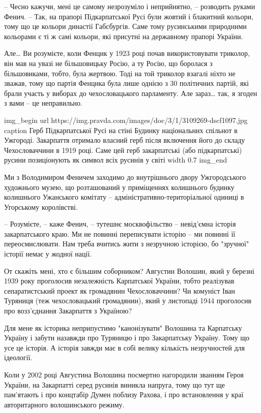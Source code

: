 – Чесно кажучи, мені це самому незрозуміло і неприйнятно, – розводить руками
Фенич. – Так, на прапорі Підкарпатської Русі були жовтий і блакитний кольори,
тому що це кольори династії Габсбургів. Саме тому русинськими природними
кольорами є ті ж самі кольори, які присутні на державному прапорі України.

Але… Ви розумієте, коли Фенцик у 1923 році почав використовувати триколор, він
мав на увазі не більшовицьку Росію, а ту Росію, що боролася з більшовиками,
тобто, була жертвою. Тоді на той триколор взагалі ніхто не зважав, тому що
партія Фенцика була лише однією з 30 політичних партій, які брали участь у
виборах до чехословацького парламенту. Але зараз… так, я згоден з вами – це
неправильно.

\ifcmt
img_begin 
        url https://img.pravda.com/images/doc/3/1/3109269-dscf1097.jpg
        caption Герб Підкарпатської Русі на стіні Будинку національних спільнот в Ужгороді. Закарпаття отримало власний герб після включення його до складу Чехословаччини в 1919 році. Саме цей герб закарпатські (або підкарпатські) русини позиціонують як символ всіх русинів у світі
        width 0.7
img_end
\fi

Ми з Володимиром Феничем заходимо до внутрішнього двору Ужгородського
художнього музею, що розташований у приміщеннях колишнього будинку колишнього
Ужанського комітату – адміністративно-територіальної одиниці в Угорському
королівстві.

– Розумієте, – каже Фенич, – тутешнє москвофільство – невід’ємна історія
закарпатського краю. Ми не повинні переписувати історію – ми повинні її
переосмислювати. Нам треба вчитись жити з незручною історією, бо "зручної"
історії немає у жодної нації.

От скажіть мені, хто є більшим соборником? Августин Волошин, який у березні
1939 року проголосив незалежність Карпатської України, тобто реалізував
сепаратистський проект як громадянин Чехословаччини? Чи комуніст Іван Туряниця
(теж чехословацький громадянин), який у листопаді 1944 проголосив про
возз’єднання Закарпаття з Україною?

Для мене як історика неприпустимо "канонізувати" Волошина та Карпатську Україну
і забути назавжди про Туряницю і про Закарпатську Україну. Тому що усе це
історія. А історія завжди має в собі велику кількість незручностей для
ідеології.

Коли у 2002 році Августина Волошина посмертно нагородили званням Героя України,
на Закарпатті серед русинів виникла напруга, тому що тут ще пам’ятають і про
концтабір Думен поблизу Рахова, і про встановлення у краї авторитарного
волошинського режиму.

